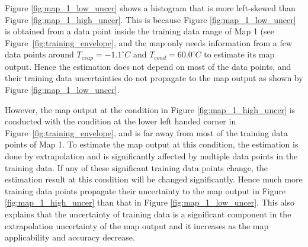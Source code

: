 Figure \ref{fig:map_1_low_uncer} shows a histogram that is more left-skewed than Figure \ref{fig:map_1_high_uncer}. This is because Figure \ref{fig:map_1_low_uncer} is obtained from a data point inside the training data range of Map 1 (see Figure~\ref{fig:training_envelope}, and the map only needs information from a few data points around $T_{evap} = -1.1^\circ C$ and $T_{cond} = 60.0^\circ C$ to estimate its map output. Hence the estimation does not depend on most of the data points, and their training data uncertainties do not propagate to the map output as shown by Figure \ref{fig:map_1_low_uncer}. 

However, the map output at the condition in Figure \ref{fig:map_1_high_uncer} is conducted with the condition at the lower left handed corner in Figure~\ref{fig:training_envelope}, and is far away from most of the training data points of Map 1. To estimate the map output at this condition, the estimation is done by extrapolation and is significantly affected by multiple data points in the training data. If any of these significant training data points change, the estimation result at this condition will be changed significantly. Hence much more training data points propagate their uncertainty to the map output in Figure \ref{fig:map_1_high_uncer} than that in Figure \ref{fig:map_1_low_uncer}. This also explains that the uncertainty of training data is a significant component in the extrapolation uncertainty of the map output and it increases as the map applicability and accuracy decrease.
